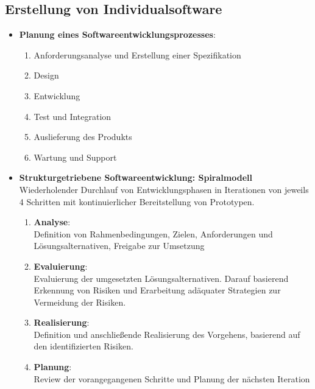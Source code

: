 \documentclass[12pt,a4paper]{article}
\begin{document}
\subsection{Erstellung von Individualsoftware} %
\begin{itemize}
   \item \textbf{Planung eines Softwareentwicklungsprozesses}:
      \begin{enumerate}
			\item Anforderungsanalyse und Erstellung einer Spezifikation
			\item Design
			\item Entwicklung
			\item Test und Integration
			\item Auslieferung des Produkts
			\item Wartung und Support
      \end{enumerate}
   
   \item \textbf{Strukturgetriebene Softwareentwicklung: Spiralmodell}\\
         Wiederholender Durchlauf von Entwicklungsphasen in Iterationen von jeweils 4 Schritten mit kontinuierlicher Bereitstellung von Prototypen.
      \begin{enumerate}
         \item \textbf{Analyse}:\\
                Definition von Rahmenbedingungen, Zielen, Anforderungen und Lösungsalternativen, Freigabe zur Umsetzung
         \item \textbf{Evaluierung}:\\
                Evaluierung der umgesetzten Lösungsalternativen. Darauf basierend Erkennung von Risiken und Erarbeitung adäquater Strategien zur Vermeidung der Risiken.
         \item \textbf{Realisierung}:\\
                Definition und anschließende Realisierung des Vorgehens, basierend auf den identifizierten Risiken.
         \item \textbf{Planung}:\\
                Review der vorangegangenen Schritte und Planung der nächsten Iteration
      \end{enumerate}
   

\end{itemize}
\end{document}
